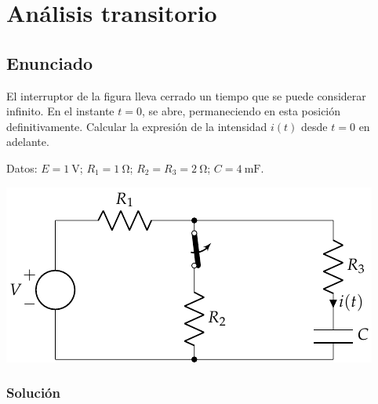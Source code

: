 \chapter{Análisis transitorio}

\section{Enunciado}
El interruptor de la figura lleva cerrado un tiempo que se puede considerar infinito. En el instante $t=0$, se abre, permaneciendo en esta posición definitivamente. Calcular la expresión de la intensidad $i(t)$ desde $t=0$ en adelante.

Datos: $E = \qty{1}{\volt}$; $R_1 = \qty{1}{\ohm}$; $R_2 = R_3 = \qty{2}{\ohm}$; $C = \qty{4}{\milli\farad}$.

\begin{center}
  \includegraphics{figuras/BT4_01.pdf}
\end{center}

\subsection*{Solución}


